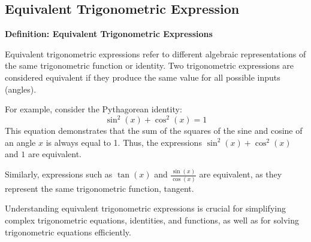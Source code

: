 \documentclass{article}
\begin{document}
\newpage 

\subsection{Equivalent Trigonometric Expression}
\textbf{Definition: Equivalent Trigonometric Expressions}

Equivalent trigonometric expressions refer to different algebraic representations of the same trigonometric function or identity. Two trigonometric expressions are considered equivalent if they produce the same value for all possible inputs (angles).

For example, consider the Pythagorean identity:
\[
\sin^2(x) + \cos^2(x) = 1
\]
This equation demonstrates that the sum of the squares of the sine and cosine of an angle \( x \) is always equal to 1. Thus, the expressions \( \sin^2(x) + \cos^2(x) \) and \( 1 \) are equivalent.

Similarly, expressions such as \( \tan(x) \) and \( \frac{\sin(x)}{\cos(x)} \) are equivalent, as they represent the same trigonometric function, tangent.

Understanding equivalent trigonometric expressions is crucial for simplifying complex trigonometric equations, identities, and functions, as well as for solving trigonometric equations efficiently.
\end{document}

